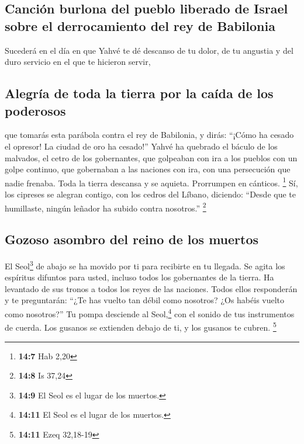 \begin{paracol}{2}
\hypertarget{canciuxf3n-burlona-del-pueblo-liberado-de-israel-sobre-el-derrocamiento-del-rey-de-babilonia}{%
\subsection{Canción burlona del pueblo liberado de Israel sobre el
derrocamiento del rey de
Babilonia}\label{canciuxf3n-burlona-del-pueblo-liberado-de-israel-sobre-el-derrocamiento-del-rey-de-babilonia}}

 Sucederá en el día en que Yahvé te dé descanso de tu
dolor, de tu angustia y del duro servicio en el que te hicieron servir,

\hypertarget{alegruxeda-de-toda-la-tierra-por-la-cauxedda-de-los-poderosos}{%
\subsection{Alegría de toda la tierra por la caída de los
poderosos}\label{alegruxeda-de-toda-la-tierra-por-la-cauxedda-de-los-poderosos}}

 que tomarás esta parábola contra el rey de Babilonia, y
dirás: ``¡Cómo ha cesado el opresor! La ciudad de oro ha cesado!''
 Yahvé ha quebrado el báculo de los malvados, el cetro de
los gobernantes,  que golpeaban con ira a los pueblos con
un golpe continuo, que gobernaban a las naciones con ira, con una
persecución que nadie frenaba.  Toda la tierra descansa y
se aquieta. Prorrumpen en cánticos. \footnote{\textbf{14:7} Hab 2,20}
 Sí, los cipreses se alegran contigo, con los cedros del
Líbano, diciendo: ``Desde que te humillaste, ningún leñador ha subido
contra nosotros.'' \footnote{\textbf{14:8} Is 37,24}

\hypertarget{gozoso-asombro-del-reino-de-los-muertos}{%
\subsection{Gozoso asombro del reino de los
muertos}\label{gozoso-asombro-del-reino-de-los-muertos}}

 El Seol\footnote{\textbf{14:9} El Seol es el lugar de los
  muertos.} de abajo se ha movido por ti para recibirte en tu llegada.
Se agita los espíritus difuntos para usted, incluso todos los
gobernantes de la tierra. Ha levantado de sus tronos a todos los reyes
de las naciones.  Todos ellos responderán y te
preguntarán: ``¿Te has vuelto tan débil como nosotros? ¿Os habéis vuelto
como nosotros?''  Tu pompa desciende al Seol,\footnote{\textbf{14:11}
  El Seol es el lugar de los muertos.} con el sonido de tus instrumentos
de cuerda. Los gusanos se extienden debajo de ti, y los gusanos te
cubren. \footnote{\textbf{14:11} Ezeq 32,18-19}


\end{paracol}
